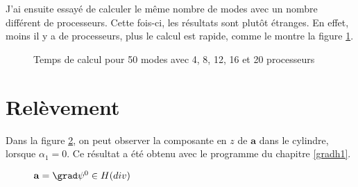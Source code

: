 J'ai ensuite essayé de calculer le même nombre de modes avec un nombre différent de processeurs. Cette fois-ci, les résultats sont plutôt étranges. En effet, moins il y a de processeurs, plus le calcul est rapide, comme le montre la figure \ref{temps_mode}.

\begin{figure}[H]
\caption{Temps de calcul pour 50 modes avec 4, 8, 12, 16 et 20 processeurs}
\label{temps_mode}
\end{figure}

\fi

\section{Relèvement}

Dans la figure \ref{az}, on peut observer la composante en $z$ de $\mathbf{a}$ dans le cylindre, lorsque $\alpha_1=0$. Ce résultat a été obtenu avec le programme du chapitre \ref{gradh1}. 

\begin{figure}[H]
\makebox[\textwidth][c]{
  \subfloat{\texttt{[image: az]}}\ 
  \subfloat{\texttt{[image: az1]}}
}
\caption{$\mathbf{a}=\grad\psi^0\in H(div)$}
\label{az}
\end{figure}
